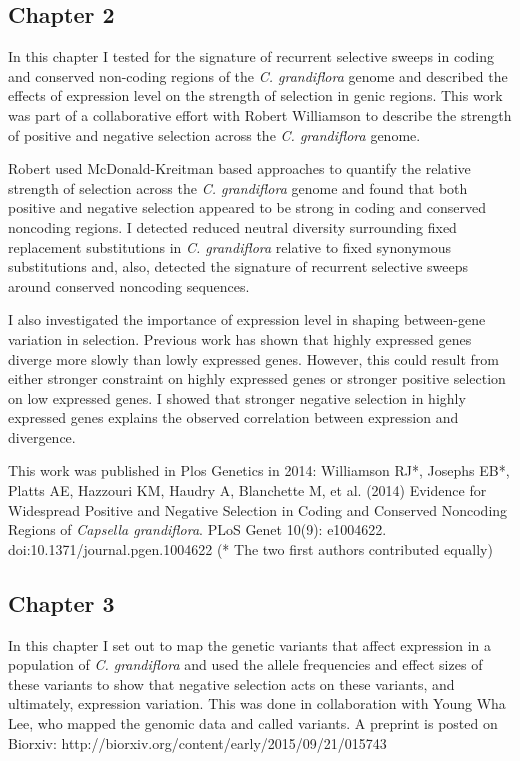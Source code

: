 \subsection{Chapter 2}

In this chapter I tested for the signature of recurrent selective sweeps in coding and conserved non-coding regions of the \textit{C. grandiflora} genome and described the effects of expression level on the strength of selection in genic regions. This work was part of a collaborative effort with Robert Williamson to describe the strength of positive and negative selection across the \textit{C. grandiflora} genome. 

Robert used McDonald-Kreitman based approaches to quantify the relative strength of selection across the \textit{C. grandiflora} genome and found that both positive and negative selection appeared to be strong in coding and conserved noncoding regions. I detected reduced neutral diversity surrounding fixed replacement substitutions in \textit{C. grandiflora} relative to fixed synonymous substitutions and, also, detected the signature of recurrent selective sweeps around conserved noncoding sequences.

I also investigated the importance of expression level in shaping between-gene variation in selection. Previous work has shown that highly expressed genes diverge more slowly than lowly expressed genes. However, this could result from either stronger constraint on highly expressed genes or stronger positive selection on low expressed genes. I showed that stronger negative selection in highly expressed genes explains the observed correlation between expression and divergence.

This work was published in Plos Genetics in 2014: Williamson RJ*, Josephs EB*, Platts AE, Hazzouri KM, Haudry A, Blanchette M, et al. (2014) Evidence for Widespread Positive and Negative Selection in Coding and Conserved Noncoding Regions of \textit{Capsella grandiflora}. PLoS Genet 10(9): e1004622. doi:10.1371/journal.pgen.1004622 (* The two first authors contributed equally)

\subsection{Chapter 3}
	In this chapter I set out to map the genetic variants that affect expression in a population of \textit{C. grandiflora} and used the allele frequencies and effect sizes of these variants to show that negative selection acts on these variants, and ultimately, expression variation. This was done in collaboration with Young Wha Lee, who mapped the genomic data and called variants. A preprint is posted on Biorxiv: http://biorxiv.org/content/early/2015/09/21/015743

